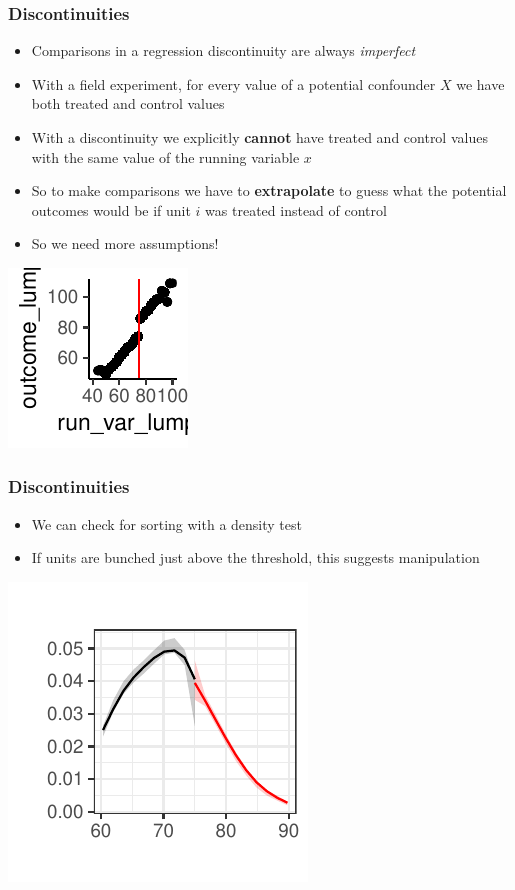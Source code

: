 \documentclass[xcolor=x11names,compress]{beamer}\usepackage[]{graphicx}\usepackage[]{color}
\makeatletter
\def\maxwidth{ %
  \ifdim\Gin@nat@width>\linewidth
    \linewidth
  \else
    \Gin@nat@width
  \fi
}
\newenvironment{knitrout}{}{} %
\renewcommand{\(}{\begin{columns}}
\renewcommand{\)}{\end{columns}}
\newcommand{\<}[1]{\begin{column}{#1}}
\renewcommand{\>}{\end{column}}
\makeatother
\begin{document}
\begin{frame}
\frametitle{Discontinuities}
\begin{itemize}
\item Comparisons in a regression discontinuity are always \textit{imperfect}
\pause
\item With a field experiment, for every value of a potential confounder $X$ we have both treated and control values
\pause
\item With a discontinuity we explicitly \textbf{cannot} have treated and control values with the same value of the running variable $x$
\pause
\item So to make comparisons we have to \textbf{extrapolate} to guess what the potential outcomes would be if unit $i$ was treated instead of control
\pause
\item So we need more assumptions!
\end{itemize}
\begin{knitrout}
\color{fgcolor}
\includegraphics[width=\maxwidth]{figure/chart2_binned-1} 

\end{knitrout}

\end{frame}

\begin{frame}
\frametitle{Discontinuities}
\begin{itemize}
\item We can check for sorting with a density test
\item If units are bunched just above the threshold, this suggests manipulation
\end{itemize}

\begin{center}
\includegraphics[scale=2]{figure/Density-2.pdf}
\end{center}
\end{frame}
\end{document}
